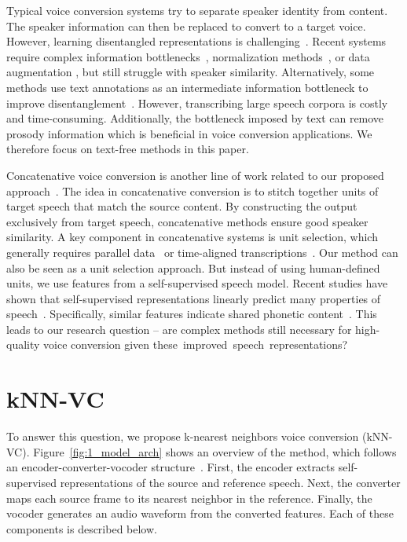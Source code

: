 \documentclass{INTERSPEECH2023}
\def\modelname{{kNN-VC}}
\begin{document}
Typical voice conversion systems try to separate speaker identity from content.
The speaker information can then be replaced
to convert to a target voice.
However, learning disentangled representations is challenging~\cite{vcc2020}.
Recent systems require complex information bottlenecks~\cite{freevc, vqmivc_wang21n_interspeech, autovc}, normalization methods~\cite{instancenormvc}, or data augmentation \cite{freevc}, but still struggle with speaker similarity.
Alternatively, some methods use text annotations as an intermediate information bottleneck to improve disentanglement~\cite{vc_categories_liu2021any,yourtts_v162-casanova22a}.
However, transcribing large speech corpora is costly and time-consuming.
Additionally, the bottleneck imposed by text can remove prosody information which is beneficial in voice conversion applications.
We therefore
focus on text-free methods in this paper.

Concatenative voice conversion is another line of work related to our proposed approach~\cite{concatenative_vc_2007, cuta_concatenative_vc}.
The idea in concatenative conversion is to stitch together units of target speech that match the source content.
By constructing the output exclusively from target speech, concatenative methods ensure good speaker similarity.
A key component in concatenative systems is unit selection, which generally requires parallel data~\cite{cuta_concatenative_vc} or time-aligned transcriptions~\cite{concatenative_text}.
Our method can also be seen as a unit selection approach. But instead of using human-defined units, we use features from a self-supervised speech model.
Recent studies have shown that self-supervised representations linearly predict many properties of speech~\cite{wav2vec_weight_analysis_2021,wavlm_prosody_weights2023}.
Specifically, similar features indicate shared phonetic content~\cite{zerospeech}.
This leads to our research question --
are complex methods still necessary for high-quality voice conversion given 
\mbox{these improved speech representations?}












\section{\modelname{}}


To answer this question, we propose k-nearest neighbors voice conversion (kNN-VC).
Figure~\ref{fig:1_model_arch} shows an overview of the method, which follows an encoder-converter-vocoder structure~\cite{vc_overview_2021}. 
First, the encoder extracts self-supervised representations of the source and reference speech.
Next, the converter maps each source frame to its nearest neighbor in the reference.
Finally, the vocoder generates an audio waveform from the converted features.
Each of these components is described below.
\end{document}
